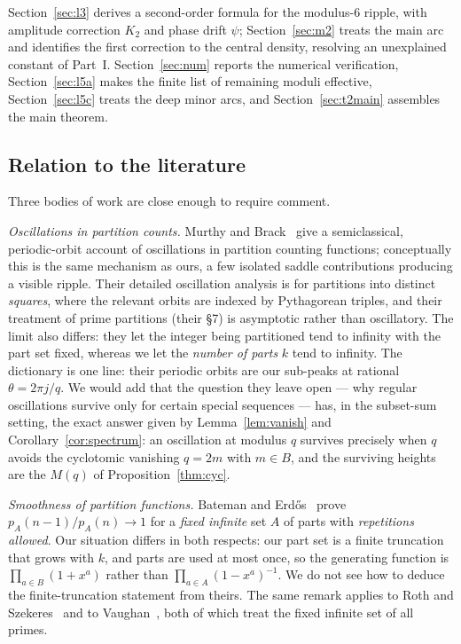 \documentclass[11pt,a4paper]{article}
\theoremstyle{plain}
\theoremstyle{definition}
\theoremstyle{remark}
\begin{document}
Section~\ref{sec:l3} derives a second-order formula for the modulus-$6$ ripple,
with amplitude correction $K_2$ and phase drift $\psi$; Section~\ref{sec:m2}
treats the main arc and identifies the first correction to the central
density, resolving an unexplained constant of Part~I.
Section~\ref{sec:num}
reports the numerical verification, Section~\ref{sec:l5a} makes the finite list
of remaining moduli effective, Section~\ref{sec:l5c} treats the deep minor arcs,
and Section~\ref{sec:t2main} assembles the main theorem.

\subsection{Relation to the literature}\label{sec:lit}

Three bodies of work are close enough to require comment.

\emph{Oscillations in partition counts.} Murthy and Brack~\cite{MB26} give a
semiclassical, periodic-orbit account of oscillations in partition counting
functions; conceptually this is the same mechanism as ours, a few isolated
saddle contributions producing a visible ripple. Their detailed oscillation
analysis is for partitions into distinct \emph{squares}, where the relevant
orbits are indexed by Pythagorean triples, and their treatment of prime
partitions (their \S7) is asymptotic rather than oscillatory. The limit also
differs: they let the integer being partitioned tend to infinity with the part
set fixed, whereas we let the \emph{number of parts} $k$ tend to infinity.
The dictionary is one line: their periodic orbits are our sub-peaks at rational
$\theta=2\pi j/q$. We would add that the question they leave open --- why regular
oscillations survive only for certain special sequences --- has, in the
subset-sum setting, the exact answer given by Lemma~\ref{lem:vanish} and
Corollary~\ref{cor:spectrum}: an oscillation at modulus $q$ survives precisely
when $q$ avoids the cyclotomic vanishing $q=2m$ with $m\in B$, and the surviving
heights are the $M(q)$ of Proposition~\ref{thm:cyc}.

\emph{Smoothness of partition functions.} Bateman and
Erd\H{o}s~\cite{BE56} prove $p_A(n-1)/p_A(n)\to1$ for a \emph{fixed infinite}
set $A$ of parts with \emph{repetitions allowed}. Our situation differs in both
respects: our part set is a finite truncation that grows with $k$, and parts are
used at most once, so the generating function is $\prod_{a\in B}(1+x^{a})$
rather than $\prod_{a\in A}(1-x^{a})^{-1}$. We do not see how to deduce the
finite-truncation statement from theirs. The same remark applies to Roth and
Szekeres~\cite{RS54} and to Vaughan~\cite{V08}, both of which treat the fixed
infinite set of all primes.
\end{document}
